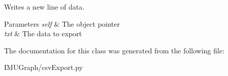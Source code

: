 Writes a new line of data. 


\begin{DoxyParams}{Parameters}
{\em self} & The object pointer \\
\hline
{\em txt} & The data to export \\
\hline
\end{DoxyParams}


The documentation for this class was generated from the following file\-:\begin{DoxyCompactItemize}
\item 
I\-M\-U\-Graph/csv\-Export.\-py\end{DoxyCompactItemize}
